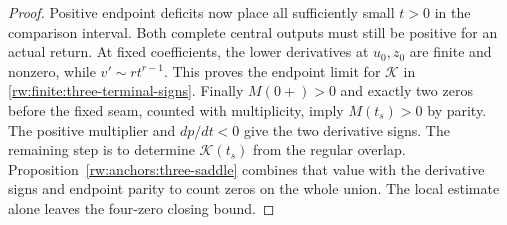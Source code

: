 \begin{proof}
Positive endpoint deficits now place all sufficiently small $t>0$
in the comparison interval. Both complete central outputs must still
be positive for an actual return. At fixed coefficients, the lower
derivatives at $u_0,z_0$ are finite and nonzero, while
$v'\sim rt^{r-1}$.
This proves the endpoint limit for $\mathcal K$ in
\eqref{rw:finite:three-terminal-signs}.
Finally $M(0+)>0$ and exactly two zeros before the fixed seam,
counted with multiplicity, imply $M(t_s)>0$ by parity.
The positive multiplier and $dp/dt<0$ give the two derivative signs.
The remaining step is to determine $\mathcal K(t_s)$ from the
regular overlap. Proposition~\ref{rw:anchors:three-saddle} combines
that value with the derivative signs and endpoint parity to count
zeros on the whole union. The local estimate alone leaves the
four-zero closing bound.
\end{proof}
